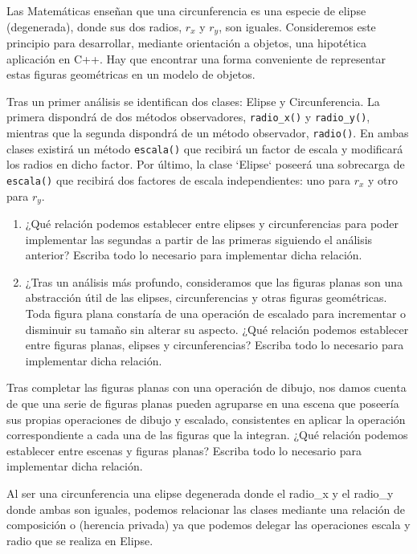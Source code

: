  Las Matemáticas enseñan que una circunferencia es una especie de elipse (degenerada), donde sus dos radios, $r_{x}$ y $r_y$, son iguales. Consideremos este principio para desarrollar, mediante orientación a objetos, una hipotética aplicación en C++. Hay que encontrar una forma conveniente de representar estas figuras geométricas en un modelo de objetos.

Tras un primer análisis se identifican dos clases: Elipse y Circunferencia. La primera dispondrá de dos métodos observadores, \texttt{radio\_x()} y \texttt{radio\_y()}, mientras que la segunda dispondrá de un método observador, \texttt{radio()}. En ambas clases existirá un método \texttt{escala()} que recibirá un factor de escala y modificará los radios en dicho factor. Por último, la clase `Elipse` poseerá una sobrecarga de \texttt{escala()} que recibirá dos factores de escala independientes: uno para $r_x$ y otro para $r_y$.

\begin{enumerate}[label=\alph*)]
    \item¿Qué relación podemos establecer entre elipses y circunferencias para poder implementar las segundas a partir de las primeras siguiendo el análisis anterior? Escriba todo lo necesario para implementar dicha relación.
    
    \item ¿Tras un análisis más profundo, consideramos que las figuras planas son una abstracción útil de las elipses, circunferencias y otras figuras geométricas. Toda figura plana constaría de una operación de escalado para incrementar o disminuir su tamaño sin alterar su aspecto. ¿Qué relación podemos establecer entre figuras planas, elipses y circunferencias? Escriba todo lo necesario para implementar dicha relación.
\end{enumerate}

Tras completar las figuras planas con una operación de dibujo, nos damos cuenta de que una serie de figuras planas pueden agruparse en una escena que poseería sus propias operaciones de dibujo y escalado, consistentes en aplicar la operación correspondiente a cada una de las figuras que la integran. ¿Qué relación podemos establecer entre escenas y figuras planas? Escriba todo lo necesario para implementar dicha relación.


Al ser una circunferencia una elipse degenerada donde el radio\_x y el radio\_y donde ambas son iguales, podemos relacionar las clases mediante una relación de composición o (herencia privada) ya que podemos delegar las operaciones escala y radio que se realiza en Elipse.

